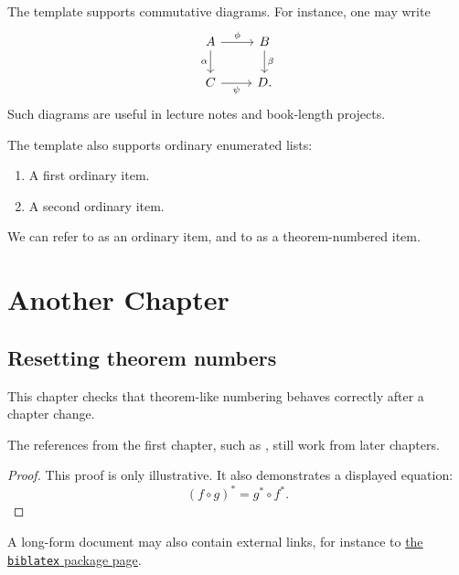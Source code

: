 \documentclass[12pt,a4paper]{amsbook}
\begin{document}
The template supports commutative diagrams. For instance, one may write
\[
\begin{tikzcd}
  A \arrow[r, "\phi"] \arrow[d, "\alpha"'] &
  B \arrow[d, "\beta"] \\
  C \arrow[r, "\psi"'] &
  D .
\end{tikzcd}
\]
Such diagrams are useful in lecture notes and book-length projects.

The template also supports ordinary enumerated lists:
\begin{enumerate}[label=(\alph*), ref=(\alph*)]
  \item \label{item:longform-ordinary-first} A first ordinary item.
  \item \label{item:longform-ordinary-second} A second ordinary item.
\end{enumerate}
We can refer to  as an ordinary item, and
to  as a theorem-numbered item.

\chapter{Another Chapter}

\section{Resetting theorem numbers}

This chapter checks that theorem-like numbering behaves correctly after a
chapter change.

\begin{lemma}\label{lemma:second-chapter}
The references from the first chapter, such as
, still work from later chapters.
\end{lemma}

\begin{proof}
This proof is only illustrative. It also demonstrates a displayed equation:
\[
  (f \circ g)^* = g^* \circ f^* .
\]
\end{proof}

\begin{example}\label{example:external-link}
A long-form document may also contain external links, for instance to
\href{https://www.ctan.org/pkg/biblatex}{the \texttt{biblatex} package page}.
\end{example}

\printbibliography
\end{document}
